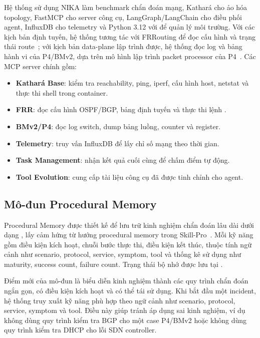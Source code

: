 Hệ thống sử dụng NIKA làm benchmark chẩn đoán mạng, Kathará cho ảo hóa topology, FastMCP cho server công cụ, LangGraph/LangChain cho điều phối agent, InfluxDB cho telemetry và Python 3.12 với  để quản lý môi trường. Với các kịch bản định tuyến, hệ thống tương tác với FRRouting để đọc cấu hình và trạng thái route~\citep{frr2021}; với kịch bản data-plane lập trình được, hệ thống đọc log và bảng hành vi của P4/BMv2, dựa trên mô hình lập trình packet processor của P4~\citep{p4lang2014}. Các MCP server chính gồm:
\begin{itemize}
  \item \textbf{Kathará Base}: kiểm tra reachability, ping, iperf, cấu hình host, netstat và thực thi shell trong container.
  \item \textbf{FRR}: đọc cấu hình OSPF/BGP, bảng định tuyến và thực thi lệnh .
  \item \textbf{BMv2/P4}: đọc log switch, dump bảng luồng, counter và register.
  \item \textbf{Telemetry}: truy vấn InfluxDB để lấy chỉ số mạng theo thời gian.
  \item \textbf{Task Management}: nhận kết quả cuối cùng để chấm điểm tự động.
  \item \textbf{Tool Evolution}: cung cấp tài liệu công cụ đã được tinh chỉnh cho agent.
\end{itemize}

\subsection{Mô-đun Procedural Memory}

Procedural Memory được thiết kế để lưu trữ kinh nghiệm chẩn đoán lâu dài dưới dạng , lấy cảm hứng từ hướng procedural memory trong Skill-Pro~\citep{skillpro2024}. Mỗi kỹ năng gồm điều kiện kích hoạt, chuỗi bước thực thi, điều kiện kết thúc, thuộc tính ngữ cảnh như scenario, protocol, service, symptom, tool và thống kê sử dụng như maturity, success count, failure count. Trạng thái bộ nhớ được lưu tại .

Điểm mới của mô-đun là biểu diễn kinh nghiệm thành các quy trình chẩn đoán ngắn gọn, có điều kiện kích hoạt và có thể tái sử dụng. Khi bắt đầu một incident, hệ thống truy xuất kỹ năng phù hợp theo ngữ cảnh như scenario, protocol, service, symptom và tool. Điều này giúp tránh áp dụng sai kinh nghiệm, ví dụ không dùng quy trình kiểm tra BGP cho một case P4/BMv2 hoặc không dùng quy trình kiểm tra DHCP cho lỗi SDN controller.


